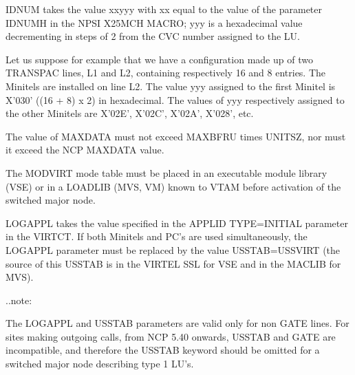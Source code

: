 \documentclass[letterpaper,10pt,english]{sphinxmanual}
\begin{document}
\begin{sphinxVerbatim}[commandchars=\\\{\}]
                         
\end{sphinxVerbatim}
\begin{description}
\sphinxAtStartPar
IDNUM takes the value xxyyy with xx equal to the value of the parameter IDNUMH in the NPSI X25MCH MACRO; yyy is a hexadecimal value decrementing in steps of 2 from the CVC number assigned to the LU.

\sphinxAtStartPar
Let us suppose for example that we have a configuration made up of two TRANSPAC lines, L1 and L2, containing respectively 16 and 8 entries. The Minitels are installed on line L2. The value yyy assigned to the first Minitel is X’030’ ((16 + 8) x 2) in hexadecimal. The values of yyy respectively assigned to the other Minitels are X’02E’, X’02C’, X’02A’, X’028’, etc.

\sphinxAtStartPar
The value of MAXDATA must not exceed MAXBFRU times UNITSZ, nor must it exceed the NCP MAXDATA value.

\sphinxAtStartPar
The MODVIRT mode table must be placed in an executable module library (VSE) or in a LOADLIB (MVS, VM) known to VTAM before activation of the switched major node.

\sphinxAtStartPar
LOGAPPL takes the value specified in the APPLID TYPE=INITIAL parameter in the VIRTCT. If both Minitels and PC’s are used simultaneously, the LOGAPPL parameter must be replaced by the value USSTAB=USSVIRT (the source of this USSTAB is in the VIRTEL SSL for VSE and in the MACLIB for MVS).

\end{description}

\sphinxAtStartPar
..note:

\begin{sphinxVerbatim}[commandchars=\\\{\}]
The LOGAPPL and USSTAB parameters are valid only for non GATE lines. For sites making outgoing calls, from NCP 5.40 onwards, USSTAB and GATE are incompatible, and therefore the USSTAB keyword should be omitted for a switched major node describing type 1 LU’s.
\end{sphinxVerbatim}
\end{document}
